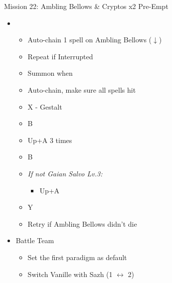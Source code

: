 	\begin{battle}[0:26]{Mission 22: Ambling Bellows \& Cryptos x2 Pre-Empt}
		\begin{itemize}
			\item \second
			      \begin{itemize}
				      \item Auto-chain 1 spell on Ambling Bellows ($\downarrow$)
				      \item Repeat if Interrupted
				      \item Summon when \stagger\
				      \item Auto-chain, make sure all spells hit
				      \item X - Gestalt
				      \item B
				      \item Up+A 3 times
				      \item B
				      \item \textit{If not Gaian Salvo Lv.3:}
					  \begin{itemize}
						\item Up+A
						\end{itemize}
				      \item Y
				      \item Retry if Ambling Bellows didn't die
			      \end{itemize}
		\end{itemize}
	\end{battle}

	\renewcommand{\sixth}{[6] Aggression (\com/\rav/\com)}

	\begin{menu}
		\begin{itemize}
			\paradigm
			\begin{itemize}
				\item Battle Team
				      \begin{itemize}
					      \item Set the first paradigm as default
					      \item Switch Vanille with Sazh (1 $\leftrightarrow$ 2)
				      \end{itemize}
			\end{itemize}
		\end{itemize}
	\end{menu}
	
